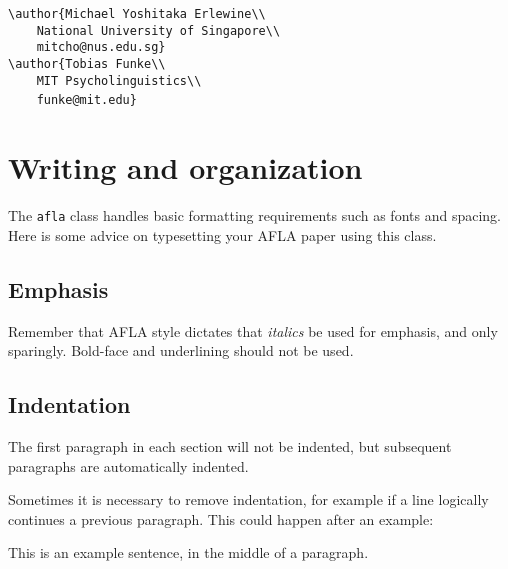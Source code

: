\documentclass{afla}
\begin{document}
\ex \verb`\author{Michael Yoshitaka Erlewine\\`\\
	\verb`    National University of Singapore\\`\\
	\verb`    mitcho@nus.edu.sg}`\\
	\verb`\author{Tobias Funke\\`\\
	\verb`    MIT Psycholinguistics\\`\\
	\verb`    funke@mit.edu}`
\xe
\

\makeatletter
\gdef\@authors\empty
\author{Michael Yoshitaka Erlewine\\
	McGill University\\
	michael.erlewine@mcgill.ca}
\author{Tobias Funke\\
	MIT Psycholinguistics\\
	funke@mit.edu}
{\@bspreauthor \@author \@bspostauthor}
\makeatother

\section{Writing and organization}

The \verb`afla` class handles basic formatting requirements such as fonts and spacing. Here is some advice on typesetting your AFLA paper using this class.

\subsection{Emphasis}

Remember that AFLA style dictates that \textit{italics} be used for emphasis, and only sparingly. Bold-face and underlining should not be used.

\subsection{Indentation}

The first paragraph in each section will not be indented, but subsequent paragraphs are automatically indented.

Sometimes it is necessary to remove indentation, for example if a line logically continues a previous paragraph. This could happen after an example:

\ex This is an example sentence, in the middle of a paragraph.
\xe
\
\end{document}
